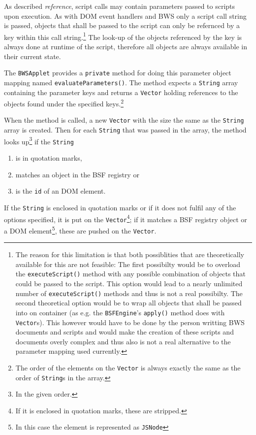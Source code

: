 As described \emph{reference}, script calls may contain parameters passed to scripts upon execution. As with DOM event handlers and BWS only a script call string is passed, objects that shall be passed to the script can only be refernced by a key within this call string.\footnote{The reason for this limitation is that both possiblities that are theoretically available for this are not feasible: The first possibilty would be to overload the \texttt{executeScript()} method with any possible combination of objects that could be passed to the script. This option would lead to a nearly unlimited number of \texttt{executeScript()} methods and thus is not a real possibilty. The second theoretical option would be to wrap all objects that shall be passed into on container (as e.g. the \texttt{BSFEngine}'s \texttt{apply()} method does with \texttt{Vector}s). This however would have to be done by the person writting BWS documents and scripts and would make the creation of these scripts and documents overly complex and thus also is not a real alternative to the parameter mapping used currently.} The look-up of the objects referenced by the key is always done at runtime of the script, therefore all objects are always available in their current state.

The \texttt{BWSApplet} provides a \texttt{private} method for doing this parameter object mapping named \texttt{evaluateParameters()}. The method expects a \texttt{String} array containing the parameter keys and returns a \texttt{Vector} holding references to the objects found under the specified keys.\footnote{The order of the elements on the \texttt{Vector} is always exactly the same as the order of \texttt{String}s in the array.}

When the method is called, a new \texttt{Vector} with the size the same as the \texttt{String} array is created. Then for each \texttt{String} that was passed in the array, the method looks up\footnote{In the given order.} if the \texttt{String}
\begin{enumerate}
	\item is in quotation marks,
	\item matches an object in the BSF registry or
	\item is the \texttt{id} of an DOM element.
	
\end{enumerate}

If the \texttt{String} is enclosed in quotation marks or if it does not fulfil any of the options specified, it is put on the \texttt{Vector}\footnote{If it is enclosed in quotation marks, these are stripped.}; if it matches a 
BSF registry object or a DOM element\footnote{In this case the element is represented as \texttt{JSNode}}, these are pushed on the \texttt{Vector}.